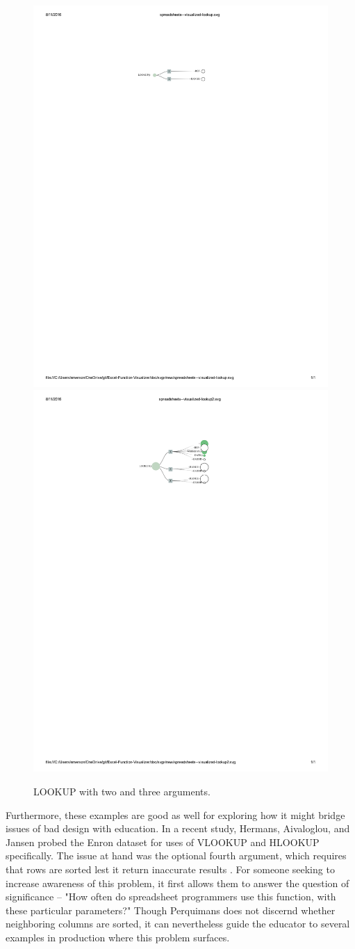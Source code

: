 \documentclass[conference]{IEEEtran}
\newcommand{\toolname}{Perquimans }
\begin{document}
	\begin{figure}[h] \centering \includegraphics[width=.5\textwidth]{lookup-2}
		\includegraphics[width=.5\textwidth]{lookup-3} \label{fig:lookups}
		\caption{LOOKUP with two and three arguments.} \end{figure}
	
	Furthermore, these examples are good as well for exploring how it might bridge
	issues of bad design with education. In a recent study, Hermans, Aivaloglou,
	and Jansen probed the Enron dataset for uses of VLOOKUP and HLOOKUP
	specifically. The issue at hand was the optional fourth argument, which
	requires that rows are sorted lest it return inaccurate results
	\cite{hermans2015detecting}. For someone seeking to increase awareness of this
	problem, it first allows them to answer the question of significance -- "How
	often do spreadsheet programmers use this function, with these particular
	parameters?" Though \toolname does not discernd whether neighboring columns are
	sorted, it can nevertheless guide the educator to several examples in
	production where this problem surfaces. \par
	
\end{document}
